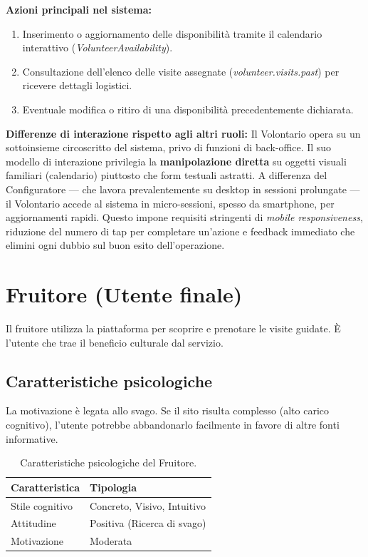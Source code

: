 \textbf{Azioni principali nel sistema:}
\begin{enumerate}
    \item Inserimento o aggiornamento delle disponibilità tramite il calendario interattivo (\textit{VolunteerAvailability}).
    \item Consultazione dell'elenco delle visite assegnate (\textit{volunteer.visits.past}) per ricevere dettagli logistici.
    \item Eventuale modifica o ritiro di una disponibilità precedentemente dichiarata.
\end{enumerate}

\textbf{Differenze di interazione rispetto agli altri ruoli:}
Il Volontario opera su un sottoinsieme circoscritto del sistema, privo di funzioni di back-office. Il suo modello di interazione privilegia la \textbf{manipolazione diretta} su oggetti visuali familiari (calendario) piuttosto che form testuali astratti. A differenza del Configuratore — che lavora prevalentemente su desktop in sessioni prolungate — il Volontario accede al sistema in micro-sessioni, spesso da smartphone, per aggiornamenti rapidi. Questo impone requisiti stringenti di \textit{mobile responsiveness}, riduzione del numero di tap per completare un'azione e feedback immediato che elimini ogni dubbio sul buon esito dell'operazione.

\section{Fruitore (Utente finale)}
Il fruitore utilizza la piattaforma per scoprire e prenotare le visite guidate. È l'utente che trae il beneficio culturale dal servizio.

\subsection{Caratteristiche psicologiche}
La motivazione è legata allo svago. Se il sito risulta complesso (alto carico cognitivo), l'utente potrebbe abbandonarlo facilmente in favore di altre fonti informative.

\begin{table}[H]
\centering
\begin{tabular}{|l|l|}
\hline
\textbf{Caratteristica} & \textbf{Tipologia} \\ \hline
Stile cognitivo & Concreto, Visivo, Intuitivo \\ \hline
Attitudine & Positiva (Ricerca di svago) \\ \hline
Motivazione & Moderata \\ \hline
\end{tabular}
\caption{Caratteristiche psicologiche del Fruitore.}
\label{tab:fruit_psicologiche}
\end{table}

